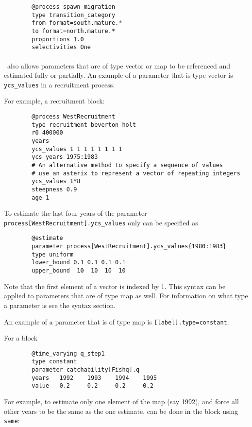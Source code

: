 {\small{\begin{verbatim}
		@process spawn_migration
		type transition_category
		from format=south.mature.*
		to format=north.mature.*
		proportions 1.0
		selectivities One
		\end{verbatim}}}


\paragraph*{\label{sec:params}}

\CNAME\ also allows parameters that are of type vector or map to be referenced and estimated fully or partially. An example of a parameter that is type vector is \texttt{ycs\_values} in a recruitment process.

For example, a recruitment block:

{\small{\begin{verbatim}
		@process WestRecruitment
		type recruitment_beverton_holt
		r0 400000
		years
		ycs_values 1 1 1 1 1 1 1 1
		ycs_years 1975:1983
		# An alternative method to specify a sequence of values
		# use an asterix to represent a vector of repeating integers
		ycs_values 1*8
		steepness 0.9
		age 1
		\end{verbatim}}}

To estimate the last four years of the parameter \texttt{process[WestRecruitment].ycs\_values} only can be specified as

{\small{\begin{verbatim}
		@estimate
		parameter process[WestRecruitment].ycs_values{1980:1983}
		type uniform
		lower_bound 0.1 0.1 0.1 0.1
		upper_bound  10  10  10  10
		\end{verbatim}}}

Note that the first element of a vector is indexed by 1. This syntax can be applied to parameters that are of type map as well. For information on what type a parameter is see the syntax section.

An example of a parameter that is of type map is \texttt{[label].type=constant}.

For a  block

{\small{\begin{verbatim}
		@time_varying q_step1
		type constant
		parameter catchability[Fishq].q
		years 	1992	1993	1994	1995
		value 	0.2		0.2		0.2		0.2
		\end{verbatim}}}

For example, to estimate only one element of the map (say 1992), and force all other years to be the same as the one estimate, can be done in the  block using \texttt{same}:

